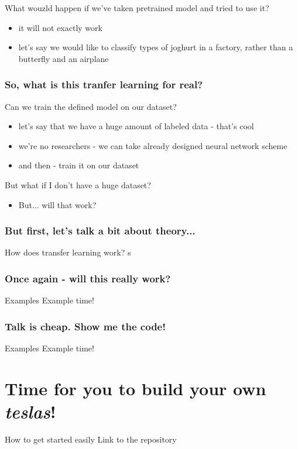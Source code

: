 \documentclass[aspectratio=1610,english]{beamer} %
\begin{document}
 	\begin{frame}{What wouzld happen if we've taken pretrained model and tried to use it?}
		 \begin{itemize}
		 	\item it will not exactly work
		 	\item let's say we would like to classify types of joghurt in a factory, rather than a butterfly and an airplane
		 \end{itemize}
	\end{frame}

\section{So, what is this tranfer learning for real?}
 	\begin{frame}{Can we train the defined model on our dataset?}
		\begin{itemize}
			\item let's say that we have a huge amount of labeled data - that's cool
			\item we're no researchers - we can take already designed neural network scheme
			\item and then - train it on our dataset
		\end{itemize}
	\end{frame}
 
 	\begin{frame}{But what if I don't have a huge dataset?}
 		\begin{itemize}
		 	\item But... will that work? 
		 \end{itemize}
	\end{frame}

\section{But first, let's talk a bit about theory...}
  	\begin{frame}{How does transfer learning work?}
		s%
	 \end{frame}
 
 \section{Once again - will this really work?}
  	\begin{frame}{Examples}
		Example time!
	\end{frame}
  	
  	\section{Talk is cheap. Show me the code!}
	\begin{frame}{Examples}
	Example time!
	\end{frame}
	
	
\part{Time for you to build your own \textit{teslas}!}
	\begin{frame}{How to get started easily}
	Link to the repository
	\end{frame}
\end{document}
